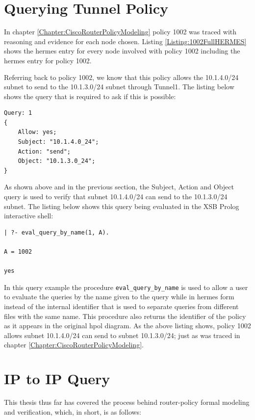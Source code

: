 \documentclass[12pt,letterpaper]{report}
\begin{document}
\section{Querying Tunnel Policy}	

In chapter \ref{Chapter:CiscoRouterPolicyModeling} policy 1002 was traced with reasoning and evidence for each node chosen. Listing \ref{Listing:1002FullHERMES} shows the \ac{hermes} entry for every node involved with policy 1002 including the \ac{hermes} entry for policy 1002.



Referring back to policy 1002, we know that this policy allows the 10.1.4.0/24 subnet to send to the 10.1.3.0/24 subnet through Tunnel1. The listing below shows the query that is required to ask if this is possible:

\begin{lstlisting}[style=hermes,]
Query: 1
{
	Allow: yes;
	Subject: "10.1.4.0_24";
	Action: "send";
	Object: "10.1.3.0_24";
}
\end{lstlisting}

As shown above and in the previous section, the Subject, Action and Object query is used to verify that subnet 10.1.4.0/24 can send to the 10.1.3.0/24 subnet. The listing below shows this query being evaluated in the XSB Prolog interactive shell:

\begin{lstlisting}[style=hermes,]
| ?- eval_query_by_name(1, A).

A = 1002

yes
\end{lstlisting}

In this query example the procedure \texttt{eval\_query\_by\_name} is used to allow a user to evaluate the queries by the name given to the query while in \ac{hermes} form instead of the internal identifier that is used to separate queries from different files with the same name. This procedure also returns the identifier of the policy as it appears in the original \ac{hpol} diagram. As the above listing shows, policy 1002 allows subnet 10.1.4.0/24 can send to subnet 10.1.3.0/24; just as was traced in chapter \ref{Chapter:CiscoRouterPolicyModeling}.

\section{IP to IP Query}
This thesis thus far has covered the process behind router-policy formal modeling and verification, which, in short, is as follows: 
\end{document}
